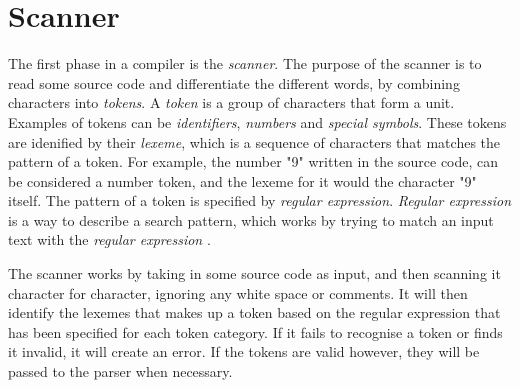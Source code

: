 \section{Scanner} \label{chap:scanner}

The first phase in a compiler is the \textit{scanner}.
The purpose of the scanner is to read some source code and differentiate the different words, by combining 
characters into \emph{tokens}.
A \emph{token} is a group of characters that form a unit. Examples of tokens can be 
\emph{identifiers}, \emph{numbers} and \emph{special symbols}. 
These tokens are idenified by their \emph{lexeme}, which is a sequence of characters that matches the pattern of a token.
For example, the number "9" written
in the source code, can be considered a number token, and the lexeme for it would the character "9" itself. 
The pattern of a token is specified by \emph{regular expression}.
\emph{Regular expression} is a way to describe a search pattern, which works by trying to match an input
text with the \emph{regular expression} \cite{crafting_a_compiler}.

The scanner works by taking in some source code as input, and then scanning it character for character, 
ignoring any white space or comments. It will then identify the lexemes that makes up a token
based on the regular expression that has been specified for each token category. If it fails to recognise 
a token or finds it invalid, it will create an error. If the tokens are valid however, they
will be passed to the parser when necessary. 

